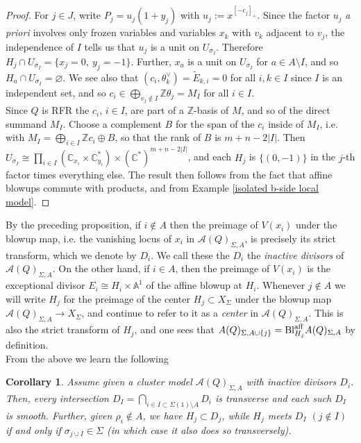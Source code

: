 \documentclass[11pt]{amsart}
\newtheorem{cor}[thm]{Corollary}
\theoremstyle{definition}
\theoremstyle{remark}
\newcommand{\Z}{\mathbb{Z}}
\newcommand{\C}{\mathbb{C}}
\newcommand{\A}{\mathcal{A}}
\renewcommand{\emptyset}{\varnothing}
\numberwithin{equation}{section}
\begin{document}
\begin{proof}
For $j \in J$, write $P_j = u_j(1+y_j)$ with $u_j:=x^{[-c_j]_+}$. Since the factor $u_j$ \textit{a priori} involves only frozen variables and variables
$x_k$ with $v_k$ adjacent to $v_j$, the independence of $I$ tells us that $u_j$ is a unit on
$U_{\sigma_I}$. Therefore $H_j\cap U_{\sigma_I}=\{x_j=0,\ y_j=-1\}$. Further, $x_a$ is a unit on
$U_{\sigma_I}$ for $a \in A\setminus I$, and so $H_a \cap U_{\sigma_I} = \emptyset$. We see also that $(c_i,\theta_k^\vee) =\tilde{E}_{k,i}=0$ for all $i,k\in I$ since $I$ is an independent set, and
so $c_i\in \bigoplus_{v_j \notin I} \mathbb {Z} \theta_j = M_I$ for all $i \in I$.\\

Since $Q$ is RFR the $c_i$, $i\in I$, are part of a $\Z$-basis of $M$, and so of the direct summand
$M_I$. Choose a complement $B$ for the span of the $c_i$ inside of $M_I$, i.e. with $M_I=\bigoplus_{i\in I}\Z c_i \oplus B$, so that the rank of $B$  is $m+n-2|I|$.
Then $U_{\sigma_I}\cong\prod_{i\in I}(\C_{x_i}\times\C^*_{y_i})\times (\mathbb{C}^*)^{m + n - 2|I|}$, and each
$H_j$ is $\{(0,-1)\}$ in the $j$-th factor times everything else. The result then follows from the fact that affine blowups commute with products, and from Example \ref{isolated b-side local model}.
\end{proof}

By the preceding proposition, if $i \notin A$ then the preimage of $V(x_i)$ under the blowup map, i.e. the vanishing locus of $x_i$ in $\mathcal{A}(Q)_{\Sigma, A}$, is precisely its strict transform, which we denote by $D_i$. We call these the $D_i$ the \textit{inactive divisors} of $\mathcal{A}(Q)_{\Sigma, A}$. On the other hand, if $i \in A$, then the preimage of $V(x_i)$ is the exceptional divisor $E_i \cong H_i \times \mathbb{A}^1$ of the affine blowup at $H_i$. Whenever $j \notin A$ we will write $H_j$ for the preimage of the center $H_j \subset X_\Sigma$ under the blowup map $\mathcal{A}(Q)_{\Sigma, A} \rightarrow X_\Sigma$, and continue to refer to it as a \textit{center} in $\mathcal{A}(Q)_{\Sigma, A}$. This is also the strict transform of $H_j$, and one sees that $\mathcal \A(Q)_{\Sigma,A\cup\{j\}}=\mathrm{Bl}^{\mathrm{aff}}_{H_j}\mathcal \A(Q)_{\Sigma,A}$ by definition.\\

From the above we learn the following 

\begin{cor}\label{transversality}
    Assume given a cluster model $\mathcal{A}(Q)_{\Sigma, A}$ with inactive divisors $D_i$. Then, every intersection $D_I = \bigcap_{i \in I \subset \Sigma(1) \setminus A} D_i$ is transverse and each such $D_I$ is smooth. Further, given $\rho_i \notin A$, we have $H_j \subset D_j$, while $H_j$ meets $D_I$ $(j \notin I)$ if and only if $\sigma_{j \cup I}\in\Sigma$ (in which case it also does so transversely).
\end{cor}
\end{document}
